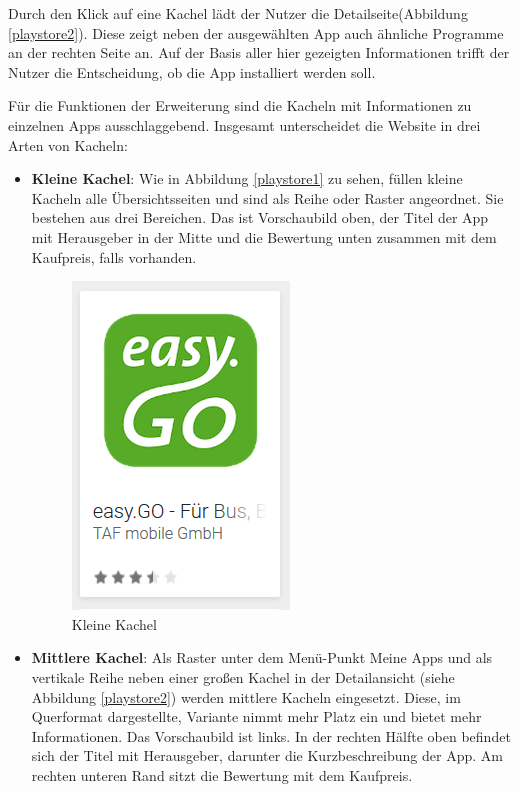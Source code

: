 Durch den Klick auf eine Kachel lädt der Nutzer die Detailseite(Abbildung \ref{playstore2}). Diese zeigt neben der ausgewählten App auch ähnliche Programme an der rechten Seite an. Auf der Basis aller hier gezeigten Informationen trifft der Nutzer die Entscheidung, ob die App installiert werden soll.

Für die Funktionen der Erweiterung sind die Kacheln mit Informationen zu einzelnen Apps ausschlaggebend. Insgesamt unterscheidet die Website in drei Arten von Kacheln:

\begin{itemize}
	\item \textbf{Kleine Kachel}:	
	Wie in Abbildung \ref{playstore1} zu sehen, füllen kleine Kacheln alle Übersichtsseiten und sind als Reihe oder Raster angeordnet. Sie bestehen aus drei Bereichen. Das ist Vorschaubild oben, der Titel der App mit Herausgeber in der Mitte und die Bewertung unten zusammen mit dem Kaufpreis, falls vorhanden.
	
	\begin{figure}[H]
		\centering
		\includegraphics{pics/kachel1.png}
		\caption{Kleine Kachel}
		\label{kachel1}
	\end{figure}
	
	
	\item \textbf{Mittlere Kachel}:
	Als Raster unter dem Menü-Punkt \glqq Meine Apps\grqq{} und als vertikale Reihe neben einer großen Kachel in der Detailansicht (siehe Abbildung \ref{playstore2}) werden mittlere Kacheln eingesetzt. Diese, im Querformat dargestellte, Variante nimmt mehr Platz ein und bietet mehr Informationen.
	Das Vorschaubild ist links. In der rechten Hälfte oben befindet sich der Titel mit Herausgeber, darunter die Kurzbeschreibung der App. Am rechten unteren Rand sitzt die Bewertung mit dem Kaufpreis.
	

\end{itemize}
